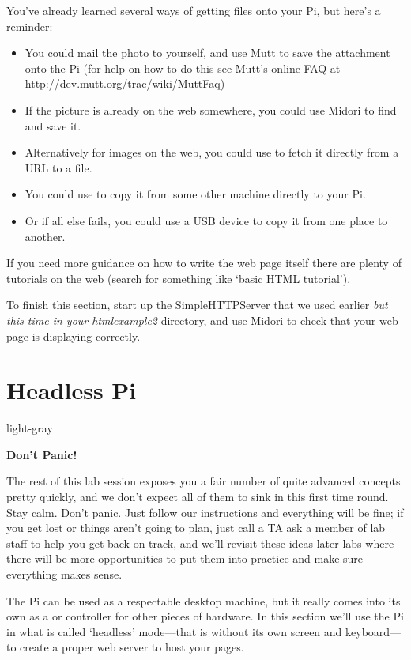 You've already learned several ways of getting files onto your Pi, but here's a reminder:
\begin{itemize}
\item You could mail the photo to yourself, and use Mutt to save the attachment onto the Pi (for help on how to do this see Mutt's online FAQ at \url{http://dev.mutt.org/trac/wiki/MuttFaq})
\item If the picture is already on the web somewhere, you could use Midori to find and save it. 
\item Alternatively for images on the web, you could use  to fetch it directly from a URL to a file. 
\item You could use  to copy it from some other machine directly to your Pi. 
\item Or if all else fails, you could use a USB device to copy it from one place to another. 
\end{itemize}

If you need more guidance on how to write the web page itself there are plenty of tutorials on the web (search for something like `basic HTML tutorial').

To finish this section, start up the SimpleHTTPServer that we used earlier \textit{but this time in your htmlexample2} directory, and use Midori to check that your web page is displaying correctly.

\FloatBarrier

\section{Headless Pi}
\label{section:headless}

\begin{stdframe}{light-gray}%
  \centerline{\textbf{Don't Panic!}}
The rest of this lab session exposes you a fair number of quite advanced concepts pretty quickly, and we don't expect all of them to sink in this first time round. Stay calm.  Don't panic. Just follow our instructions and everything will be fine; if you get lost or things aren't going to plan, just call a TA ask a member of lab staff to help you get back on track, and we'll revisit these ideas later labs where there will be more opportunities to put them into practice and make sure everything makes sense.
\end{stdframe}

The Pi can be used as a respectable desktop machine, but it really comes into its own as a  or controller for other pieces of hardware. In this section we'll use the Pi in what is called `headless' mode---that is without its own screen and keyboard---to create a proper web server to host your pages. 

